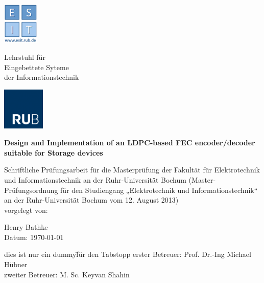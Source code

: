
\begin{titlepage}
	\thispagestyle{empty}
	\begin{minipage}[b][2.5cm][r]{1.8cm}
	\centering
    \includegraphics[height=2cm, keepaspectratio]{Graphic/Logo.png}
	\end{minipage} \hspace{0.5mm}
	\begin{minipage}[b][2cm][l]{10cm}
	{Lehrstuhl für\\
	Eingebettete Syteme\\
	der Informationstechnik}
	\end{minipage} \hspace{5mm}
	\begin{minipage}[b][2.5cm][r]{2.5cm}
	\centering
    \includegraphics[height=2cm, keepaspectratio]{Graphic/RUB.png}
	\end{minipage}	
	
	
	\begin{center}
		\vspace{3cm}
		
		{\Large \textbf{Design and Implementation of an LDPC-based FEC encoder/decoder suitable for Storage devices}}
		
		\vspace{1cm}
		Schriftliche Prüfungsarbeit für die Masterprüfung der Fakultät für Elektrotechnik und Informationstechnik an der Ruhr-Universität Bochum (Master-Prüfungsordnung für den Studiengang „Elektrotechnik und Informationstechnik“ an der Ruhr-Universität Bochum vom 12. August 2013)\\
		\vspace{1cm}
		{
			vorgelegt von: \\
		}
		
		\vspace{1.5cm}
		{
			Henry Bathke \\
		}
		\vspace{1.5cm}
		Datum: \today 
		\vspace{1.5cm}
		
		\begin{tabbing}
			dies ist nur ein dummy\= für den Tabstopp \kill
			erster Betreuer: \> Prof. Dr.-Ing Michael Hübner \\
			zweiter Betreuer: \> M. Sc. Keyvan Shahin
		\end{tabbing}
		
	\end{center}


\end{titlepage}
